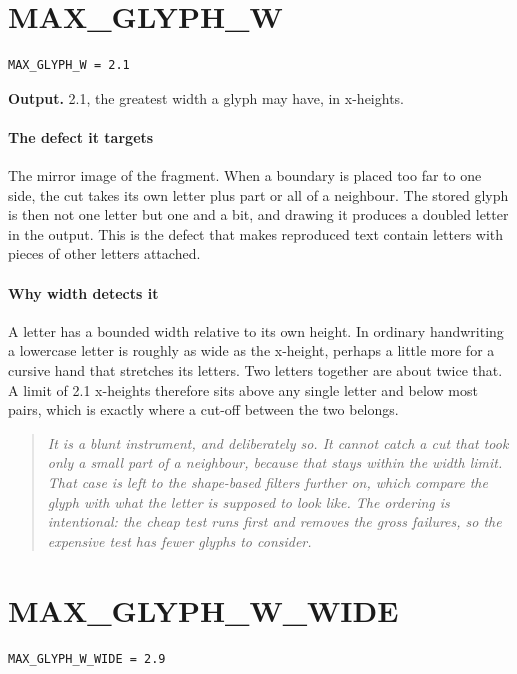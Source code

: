 \section{MAX\_GLYPH\_W}
\begin{lstlisting}[style=sig]
MAX_GLYPH_W = 2.1
\end{lstlisting}

\noindent\textbf{Output.} 2.1, the greatest width a glyph may have, in x-heights.


\paragraph{The defect it targets}
The mirror image of the fragment. When a boundary is placed too far to one side, the cut takes its own letter plus part or all of a neighbour. The stored glyph is then not one letter but one and a bit, and drawing it produces a doubled letter in the output. This is the defect that makes reproduced text contain letters with pieces of other letters attached.


\paragraph{Why width detects it}
A letter has a bounded width relative to its own height. In ordinary handwriting a lowercase letter is roughly as wide as the x-height, perhaps a little more for a cursive hand that stretches its letters. Two letters together are about twice that. A limit of 2.1 x-heights therefore sits above any single letter and below most pairs, which is exactly where a cut-off between the two belongs.


\begin{quote}\small\itshape It is a blunt instrument, and deliberately so. It cannot catch a cut that took only a small part of a neighbour, because that stays within the width limit. That case is left to the shape-based filters further on, which compare the glyph with what the letter is supposed to look like. The ordering is intentional: the cheap test runs first and removes the gross failures, so the expensive test has fewer glyphs to consider.\end{quote}

\section{MAX\_GLYPH\_W\_WIDE}
\begin{lstlisting}[style=sig]
MAX_GLYPH_W_WIDE = 2.9
\end{lstlisting}

